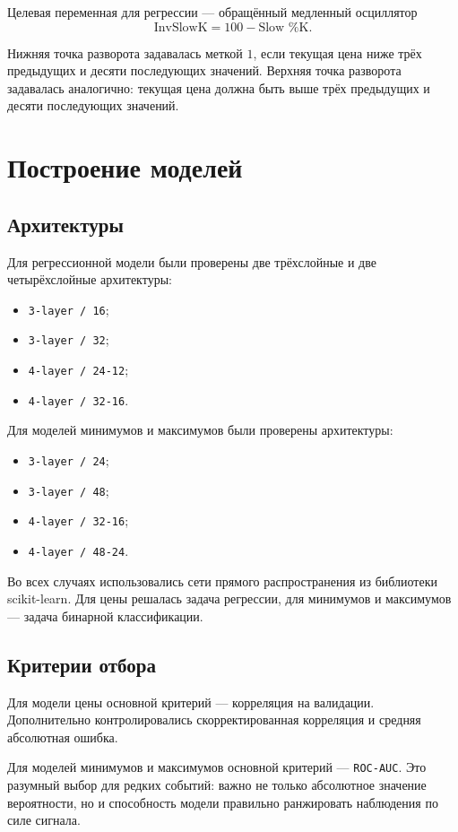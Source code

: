 \documentclass[12pt,a4paper]{article}
\begin{document}
Целевая переменная для регрессии --- обращённый медленный осциллятор
\[
\text{InvSlowK} = 100 - \text{Slow \%K}.
\]

Нижняя точка разворота задавалась меткой \(1\), если текущая цена ниже трёх предыдущих и десяти последующих значений. Верхняя точка разворота задавалась аналогично: текущая цена должна быть выше трёх предыдущих и десяти последующих значений.

\section{Построение моделей}
\subsection{Архитектуры}
Для регрессионной модели были проверены две трёхслойные и две четырёхслойные архитектуры:
\begin{itemize}
    \item \texttt{3-layer / 16};
    \item \texttt{3-layer / 32};
    \item \texttt{4-layer / 24-12};
    \item \texttt{4-layer / 32-16}.
\end{itemize}

Для моделей минимумов и максимумов были проверены архитектуры:
\begin{itemize}
    \item \texttt{3-layer / 24};
    \item \texttt{3-layer / 48};
    \item \texttt{4-layer / 32-16};
    \item \texttt{4-layer / 48-24}.
\end{itemize}

Во всех случаях использовались сети прямого распространения из библиотеки scikit-learn. Для цены решалась задача регрессии, для минимумов и максимумов --- задача бинарной классификации.

\subsection{Критерии отбора}
Для модели цены основной критерий --- корреляция на валидации. Дополнительно контролировались скорректированная корреляция и средняя абсолютная ошибка.

Для моделей минимумов и максимумов основной критерий --- \texttt{ROC-AUC}. Это разумный выбор для редких событий: важно не только абсолютное значение вероятности, но и способность модели правильно ранжировать наблюдения по силе сигнала.
\end{document}
